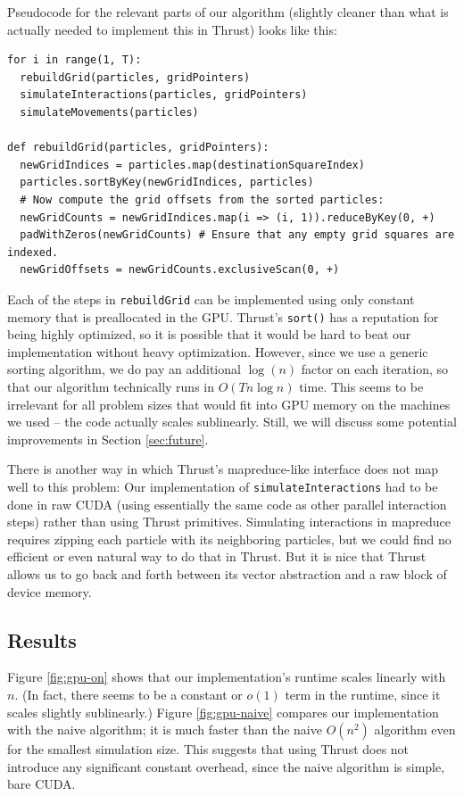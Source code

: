 \documentclass{article}
\newcommand{\code}[1]%
  {\texttt{#1}}
\begin{document}
Pseudocode for the relevant parts of our algorithm (slightly cleaner than what is actually needed to implement this in Thrust) looks like this:

\begin{verbatim}
for i in range(1, T):
  rebuildGrid(particles, gridPointers)
  simulateInteractions(particles, gridPointers)
  simulateMovements(particles)
  
def rebuildGrid(particles, gridPointers):
  newGridIndices = particles.map(destinationSquareIndex)
  particles.sortByKey(newGridIndices, particles)
  # Now compute the grid offsets from the sorted particles:
  newGridCounts = newGridIndices.map(i => (i, 1)).reduceByKey(0, +)
  padWithZeros(newGridCounts) # Ensure that any empty grid squares are indexed.
  newGridOffsets = newGridCounts.exclusiveScan(0, +)
\end{verbatim}

Each of the steps in \code{rebuildGrid} can be implemented using only constant memory that is preallocated in the GPU.  Thrust's \code{sort()} has a reputation for being highly optimized, so it is possible that it would be hard to beat our implementation without heavy optimization.  However, since we use a generic sorting algorithm, we do pay an additional $\log(n)$ factor on each iteration, so that our algorithm technically runs in $O(T n \log n)$ time.  This seems to be irrelevant for all problem sizes that would fit into GPU memory on the machines we used -- the code actually scales sublinearly.  Still, we will discuss some potential improvements in Section \ref{sec:future}.

There is another way in which Thrust's mapreduce-like interface does not map well to this problem: Our implementation of \code{simulateInteractions} had to be done in raw CUDA (using essentially the same code as other parallel interaction steps) rather than using Thrust primitives.  Simulating interactions in mapreduce requires zipping each particle with its neighboring particles, but we could find no efficient or even natural way to do that in Thrust.  But it is nice that Thrust allows us to go back and forth between its vector abstraction and a raw block of device memory.

\subsection{Results}
Figure \ref{fig:gpu-on} shows that our implementation's runtime scales linearly with $n$.  (In fact, there seems to be a constant or $o(1)$ term in the runtime, since it scales slightly sublinearly.)  Figure \ref{fig:gpu-naive} compares our implementation with the naive algorithm; it is much faster than the naive $O(n^2)$ algorithm even for the smallest simulation size.  This suggests that using Thrust does not introduce any significant constant overhead, since the naive algorithm is simple, bare CUDA.
\end{document}
